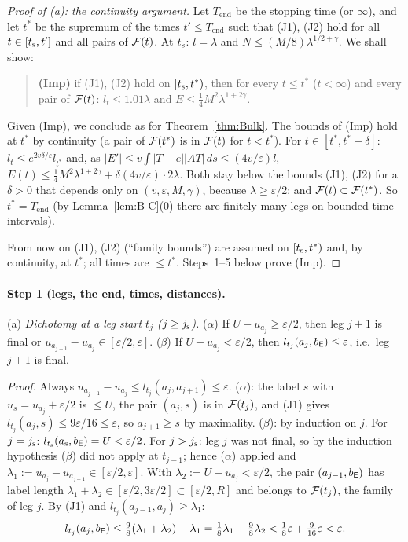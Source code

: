 \begin{proof}[Proof of \textup{(a)}: the continuity argument]
Let $T_{\mathrm{end}}$ be the stopping time (or $\infty$), and let $t^*$ be the supremum of the times $t'\le T_{\mathrm{end}}$ such
that (J1), (J2) hold for all $t\in[t_{\mathrm s},t']$ and all pairs of $\mathcal F(t)$. At $t_{\mathrm s}$: $l=\lambda$ and
$N\le(M/8)\lambda^{1/2+\gamma}$. We shall show:
\begin{quote}
\textbf{(Imp)} if (J1), (J2) hold on $[t_{\mathrm s},t^*)$, then for every $t\le t^*$ ($t<\infty$) and every pair of $\mathcal F(t)$:
$l_t\le1.01\lambda$ and $E\le\frac14M^2\lambda^{1+2\gamma}$.
\end{quote}
Given (Imp), we conclude as for Theorem~\ref{thm:Bulk}. The bounds of (Imp) hold at $t^*$ by continuity (a pair of $\mathcal F(t^*)$ is in
$\mathcal F(t)$ for $t<t^*$). For $t\in[t^*,t^*+\delta]$: $l_t\le e^{2v\delta/\varepsilon}l_{t^*}$ and, as
$|E'|\le v\int|T-e||AT|\,ds\le(4v/\varepsilon)l$, $E(t)\le\frac14M^2\lambda^{1+2\gamma}+\delta(4v/\varepsilon)\cdot2\lambda$. Both
stay below the bounds (J1), (J2) for a $\delta>0$ that depends only on $(v,\varepsilon,M,\gamma)$, because
$\lambda\ge\varepsilon/2$; and $\mathcal F(t)\subset\mathcal F(t^*)$. So $t^*=T_{\mathrm{end}}$ (by Lemma~\ref{lem:B-C}(0) there are finitely many
legs on bounded time intervals).

From now on (J1), (J2) (``family bounds'') are assumed on $[t_{\mathrm s},t^*)$ and, by continuity, at $t^*$; all times are $\le t^*$.
Steps~1--5 below prove (Imp).
\end{proof}

\paragraph{Step 1 (legs, the end, times, distances).}
(a) \emph{Dichotomy at a leg start $t_j$ ($j\ge j_{\mathrm s}$).} ($\alpha$) If $U-u_{a_j}\ge\varepsilon/2$, then leg $j+1$ is final or
$u_{a_{j+1}}-u_{a_j}\in[\varepsilon/2,\varepsilon]$. ($\beta$) If $U-u_{a_j}<\varepsilon/2$, then $l_{t_j}(a_j,b_{\mathsf E})\le\varepsilon$,
i.e.\ leg $j+1$ is final.

\emph{Proof.} Always $u_{a_{j+1}}-u_{a_j}\le l_{t_j}(a_j,a_{j+1})\le\varepsilon$. ($\alpha$): the label $s$ with
$u_s=u_{a_j}+\varepsilon/2$ is $\le U$, the pair $(a_j,s)$ is in $\mathcal F(t_j)$, and (J1) gives
$l_{t_j}(a_j,s)\le9\varepsilon/16\le\varepsilon$, so $a_{j+1}\ge s$ by maximality. ($\beta$): by induction on $j$. For $j=j_{\mathrm s}$:
$l_{t_{\mathrm s}}(a_{\mathrm s},b_{\mathsf E})=U<\varepsilon/2$. For $j>j_{\mathrm s}$: leg $j$ was not final, so by the induction hypothesis ($\beta$) did
not apply at $t_{j-1}$; hence ($\alpha$) applied and $\lambda_1:=u_{a_j}-u_{a_{j-1}}\in[\varepsilon/2,\varepsilon]$. With
$\lambda_2:=U-u_{a_j}<\varepsilon/2$, the pair $(a_{j-1},b_{\mathsf E})$ has label length
$\lambda_1+\lambda_2\in[\varepsilon/2,3\varepsilon/2]\subset[\varepsilon/2,R]$ and belongs to $\mathcal F(t_j)$, the family of leg $j$.
By (J1) and $l_{t_j}(a_{j-1},a_j)\ge\lambda_1$:
\[
l_{t_j}(a_j,b_{\mathsf E})\le\tfrac98(\lambda_1+\lambda_2)-\lambda_1=\tfrac18\lambda_1+\tfrac98\lambda_2
<\tfrac18\varepsilon+\tfrac9{16}\varepsilon<\varepsilon .
\]

